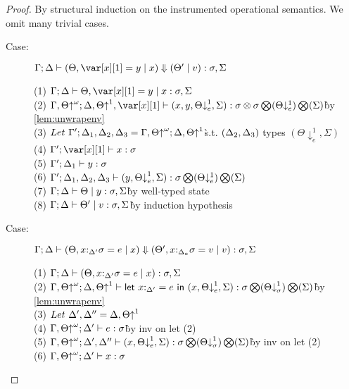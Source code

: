 \documentclass[acmsmall,review,screen]{acmart}
\newcommand{\llet}[2]{\mathsf{let}~#1~\mathsf{in}~#2}
\begin{document}
\begin{proof}
By structural induction on the instrumented operational semantics. We
omit many trivial cases.
\begin{description}
    \item[Case:] $\Gamma; \Delta \vdash (\Theta, \xl = y \mid x) \Downarrow (\Theta' \mid v) : \s, \Sigma$
\begin{tabbing}
    (1) $\G; \D \vdash \Theta, \xl = y \mid x : \s, \Sigma$\\
    (2) $\G, \Theta{\uparrow}^\omega; \D, \Theta{\uparrow}^1, \xl \vdash (x, y, \Theta{\downarrow}^1_e, \Sigma) : \s \otimes \s \bigotimes(\Theta{\downarrow^1_e}) \bigotimes(\Sigma)$\`by \ref{lem:unwrapenv}\\
    (3) $Let~\Gamma';\Delta_1,\Delta_2,\Delta_3 = \Gamma, \Theta{\uparrow}^\omega; \Delta, \Theta{\uparrow}^1$\` s.t. $(\Delta_2,\Delta_3)$ types $(\Theta{\downarrow}^1_e,\Sigma)$\\
    (4) $\G'; \xl \vdash x : \s$\\
    (5) $\Gamma'; \Delta_1 \vdash y : \sigma$\\
    (6) $\Gamma'; \Delta_1, \Delta_2, \Delta_3 \vdash (y, \Theta{\downarrow}^1_e, \Sigma) : \sigma \bigotimes(\Theta{\downarrow^1_e}) \bigotimes(\Sigma)$\\
    (7) $\Gamma; \Delta \vdash \Theta \mid y : \sigma, \Sigma$\`by well-typed state\\
    (8) $\Gamma; \Delta \vdash \Theta' \mid v : \sigma, \Sigma$\` by induction hypothesis\\
\end{tabbing}
    \item[Case:] $\Gamma; \Delta \vdash (\Theta, x{:}_{\Delta'}\sigma = e \mid x) \Downarrow (\Theta', x{:}_{\Delta_a}\sigma = v \mid v) : \sigma, \Sigma$
\begin{tabbing}
    (1) $\Gamma; \Delta \vdash (\Theta, x{:}_{\Delta'}\sigma = e \mid x) : \sigma, \Sigma$\\
    (2) $\G, \Theta{\uparrow}^\omega; \D, \Theta{\uparrow}^1 \vdash \llet{x{:}_{\D'} = e}{(x, \Theta{\downarrow}^1_e, \Sigma)} : \s \bigotimes(\Theta{\downarrow}^1_\s) \bigotimes(\Sigma)$\`by \ref{lem:unwrapenv}\\
    (3) $Let~\Delta',\Delta'' = \Delta,\Theta{\uparrow}^1$\\
    (4) $\Gamma, \Theta{\uparrow}^\omega; \Delta' \vdash e : \sigma$\`by inv on let (2)\\
    (5) $\Gamma, \Theta{\uparrow}^\omega; \Delta', \Delta'' \vdash (x, \Theta{\downarrow}^1_e, \Sigma) : \sigma \bigotimes(\Theta{\downarrow}^1_\sigma) \bigotimes(\Sigma)$\`by inv on let (2)\\
    (6) $\Gamma, \Theta{\uparrow}^\omega; \Delta' \vdash x : \sigma$\\

\end{tabbing}
\end{description}
\end{proof}
\end{document}
